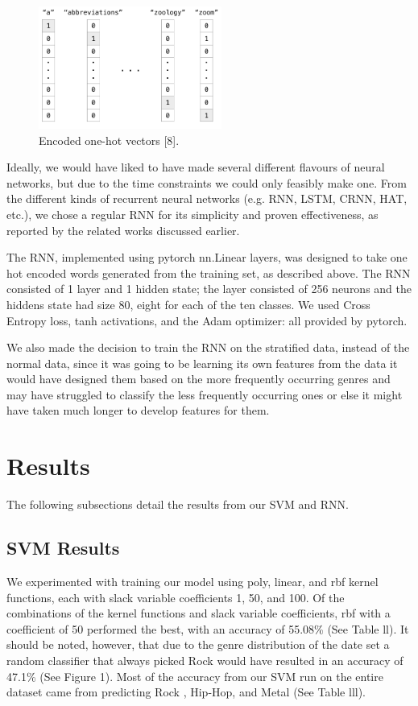 \documentclass[journal]{IEEEtran}
\begin{document}
\begin{figure}[h!]
\centering
\includegraphics[width=6cm]{Figure_7}
\caption{Encoded one-hot vectors [8].}
\end{figure}

Ideally, we would have liked to have made several different flavours of neural networks, but due to the time constraints we could only feasibly make one. From the different kinds of recurrent neural networks (e.g. RNN, LSTM, CRNN, HAT, etc.), we chose a regular RNN for its simplicity and proven effectiveness, as reported by the related works discussed earlier.

The RNN, implemented using pytorch nn.Linear layers, was designed to take one hot encoded words generated from the training set, as described above. The RNN consisted of 1 layer and 1 hidden state; the layer consisted of 256 neurons and the hiddens state had size 80, eight for each of the ten classes. We used Cross Entropy loss, tanh activations, and the Adam optimizer: all provided by pytorch.

We also made the decision to train the RNN on the stratified data, instead of the normal data,  since it was going to be learning its own features from the data it would have designed them based on the more frequently occurring genres and may have struggled to classify the less frequently occurring ones or else it might have taken much longer to develop features for them. 
 
\newpage

\section{Results}

The following subsections detail the results from our SVM and RNN.

\subsection{SVM Results}

We experimented with training our model using poly, linear, and rbf kernel functions, each with slack variable coefficients 1, 50, and 100. Of the combinations of the  kernel functions and slack variable coefficients, rbf with a coefficient of 50 performed the best, with an accuracy of 55.08\% (See Table ll). It should be noted, however, that due to the genre distribution of the date set a random classifier that always picked Rock would have resulted in an accuracy of 47.1\% (See Figure 1). Most of the accuracy from our SVM run on the entire dataset came from predicting Rock , Hip-Hop, and Metal (See Table lll).
\end{document}
